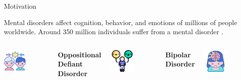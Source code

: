 \documentclass[spanish, aspectratio=169]{beamer}
\begin{document}
	
	
\frame{\titlepage}

\begin{frame}{Motivation}
	\vspace{-0.5cm}
	\begin{block}{}
		Mental disorders affect cognition, behavior, and emotions of millions of people worldwide. Around 350 million individuals suffer from a mental disorder \cite{Dehghan-Bonari2023}.
	\end{block}
	
	\begin{columns}
		\small
		\vspace{-0.2cm}
		\centering
		\includegraphics[width=0.5\textwidth]{figures/OppositionalDefiantDisorder.png}
		
		\vspace{0.5em}
		\textbf{Oppositional Defiant Disorder}
		
		\centering
		\includegraphics[width=0.5\textwidth]{figures/BipolarDisorder.png}
		
		\vspace{0.5em}
		\textbf{Bipolar Disorder}
		
		\centering
		\includegraphics[width=0.5\textwidth]{figures/ADHD.png}
		

\end{columns}
\end{frame}
\end{document}
